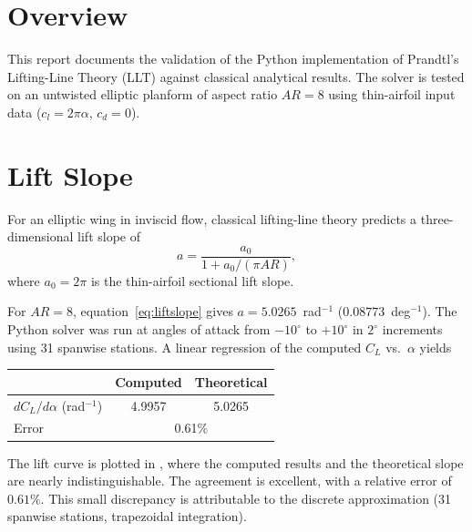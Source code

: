 \documentclass[11pt,letter]{ejlnotes}
\begin{document}
	\thispagestyle{fancy}
	
	{\bodyfont  %

		\section*{Overview}

		This report documents the validation of the Python implementation of
		Prandtl's Lifting-Line Theory (LLT) against classical analytical
		results.  The solver is tested on an untwisted elliptic planform of
		aspect ratio $AR = 8$ using thin-airfoil input data
		($c_l = 2\pi\alpha$, $c_d = 0$).

		\section*{Lift Slope}

		For an elliptic wing in inviscid flow, classical lifting-line theory
		predicts a three-dimensional lift slope of
		\begin{equation}
			a = \frac{a_0}{1 + a_0 / (\pi AR)},
			\label{eq:liftslope}
		\end{equation}
		where $a_0 = 2\pi$ is the thin-airfoil sectional lift slope.

		For $AR = 8$, equation~\eqref{eq:liftslope} gives
		$a = 5.0265$~rad$^{-1}$ ($0.08773$~deg$^{-1}$).
		The Python solver was run at angles of attack from $-10^\circ$ to
		$+10^\circ$ in $2^\circ$ increments using 31 spanwise stations.
		A linear regression of the computed $C_L$ vs.\ $\alpha$ yields

		\begin{center}
		\begin{tabular}{lcc}
			\toprule
			& Computed & Theoretical \\
			\midrule
			$dC_L/d\alpha$ (rad$^{-1}$) & 4.9957 & 5.0265 \\
			Error & \multicolumn{2}{c}{0.61\%} \\
			\bottomrule
		\end{tabular}
		\end{center}

		The lift curve is plotted in , where the
		computed results and the theoretical slope are nearly
		indistinguishable.  The agreement is excellent, with a relative
		error of $0.61\%$.  This small discrepancy is attributable to the
		discrete approximation (31 spanwise stations, trapezoidal integration).

}
\end{document}
